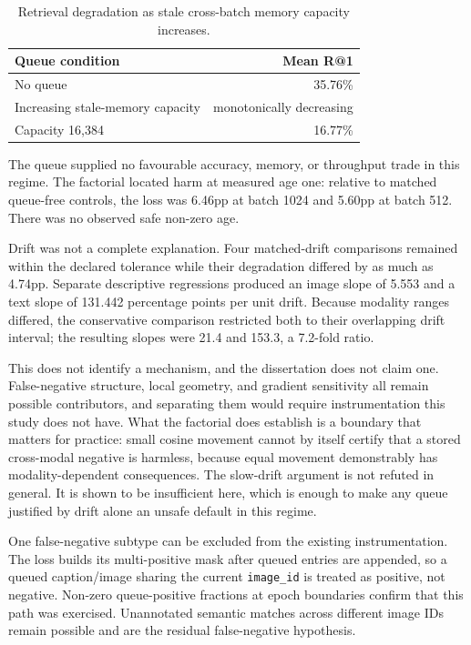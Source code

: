 \begin{table}[htbp]
\centering
\caption{Retrieval degradation as stale cross-batch memory capacity increases.}
\label{tab:queue}
\begin{tabular}{L{7.5cm}r}
\toprule
Queue condition & Mean R@1 \\
\midrule
No queue & 35.76\% \\
Increasing stale-memory capacity & monotonically decreasing \\
Capacity 16,384 & 16.77\% \\
\bottomrule
\end{tabular}
\end{table}
The queue supplied no favourable accuracy, memory, or throughput trade in this regime. The factorial located harm at measured age one: relative to matched queue-free controls, the loss was 6.46pp at batch 1024 and 5.60pp at batch 512. There was no observed safe non-zero age.

Drift was not a complete explanation. Four matched-drift comparisons remained within the declared tolerance while their degradation differed by as much as 4.74pp. Separate descriptive regressions produced an image slope of 5.553 and a text slope of 131.442 percentage points per unit drift. Because modality ranges differed, the conservative comparison restricted both to their overlapping drift interval; the resulting slopes were 21.4 and 153.3, a 7.2-fold ratio.

This does not identify a mechanism, and the dissertation does not claim one. False-negative structure, local geometry, and gradient sensitivity all remain possible contributors, and separating them would require instrumentation this study does not have. What the factorial does establish is a boundary that matters for practice: small cosine movement cannot by itself certify that a stored cross-modal negative is harmless, because equal movement demonstrably has modality-dependent consequences. The slow-drift argument is not refuted in general. It is shown to be insufficient here, which is enough to make any queue justified by drift alone an unsafe default in this regime.

One false-negative subtype can be excluded from the existing instrumentation. The loss builds its multi-positive mask after queued entries are appended, so a queued caption/image sharing the current \texttt{image\_\linebreak[1]id} is treated as positive, not negative. Non-zero queue-positive fractions at epoch boundaries confirm that this path was exercised. Unannotated semantic matches across different image IDs remain possible and are the residual false-negative hypothesis.

